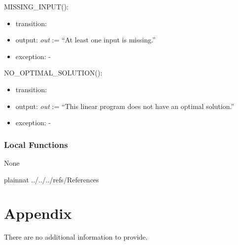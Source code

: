 \documentclass[12pt, titlepage]{article}
\begin{document}
\noindent 
MISSING\_INPUT():
\begin{itemize}
	\item transition:
	\item output: \textit{out} := ``At least one input is missing.''
	\item exception: -
\end{itemize}

\noindent 
NO\_OPTIMAL\_SOLUTION():
\begin{itemize}
	\item transition:
	\item output: \textit{out} := ``This linear program does not have an 
	optimal solution.''
	\item exception: -
\end{itemize}

\subsubsection{Local Functions}

None

\newpage

 {plainnat}
 {../../../refs/References}

\newpage

\section{Appendix} \label{Appendix}

There are no additional information to provide.
\end{document}
